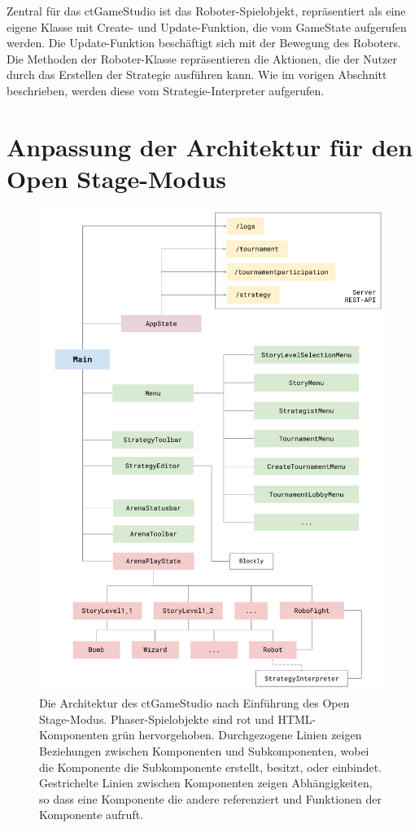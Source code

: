 Zentral für das ctGameStudio ist das Roboter-Spielobjekt, repräsentiert als eine eigene Klasse mit
Create- und Update-Funktion, die vom GameState aufgerufen werden. Die Update-Funktion beschäftigt
sich mit der Bewegung des Roboters. Die Methoden der Roboter-Klasse repräsentieren die Aktionen, die
der Nutzer durch das Erstellen der Strategie ausführen kann. Wie im vorigen Abschnitt beschrieben,
werden diese vom Strategie-Interpreter aufgerufen.


\section{Anpassung der Architektur für den Open Stage-Modus}

\begin{figure}
  \label{architektur}

  \caption{Die Architektur des ctGameStudio nach Einführung des Open
  Stage-Modus. Phaser-Spielobjekte sind rot und HTML-Komponenten grün
  hervorgehoben. Durchgezogene Linien zeigen Beziehungen zwischen Komponenten
  und Subkomponenten, wobei die Komponente die Subkomponente erstellt, besitzt,
  oder einbindet. Gestrichelte Linien zwischen Komponenten zeigen
  Abhängigkeiten, so dass eine Komponente die andere referenziert und
  Funktionen der Komponente aufruft.}

  \includegraphics{figures/architektur.pdf}
\end{figure}

